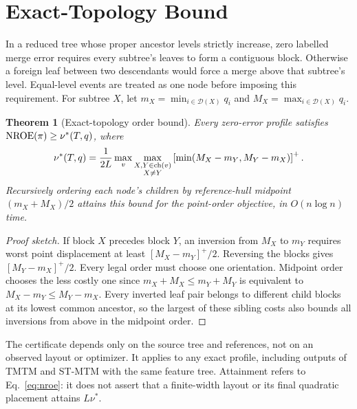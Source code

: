 \documentclass{vgtc}                %
\newtheorem{theorem}{Theorem}\newtheorem{lemma}{Lemma}\newtheorem{proposition}{Proposition}
\begin{document}
\section{Exact-Topology Bound}\label{sec:exact}
In a reduced tree whose proper ancestor levels strictly increase, zero labelled merge error requires every subtree's leaves to form a contiguous block. Otherwise a foreign leaf between two descendants would force a merge above that subtree's level. Equal-level events are treated as one node before imposing this requirement. For subtree $X$, let $m_X=\min_{i\in\mathcal{D}(X)}q_i$ and $M_X=\max_{i\in\mathcal{D}(X)}q_i$.

\begin{theorem}[Exact-topology order bound]\label{thm:order}
Every zero-error profile satisfies $\mathrm{NROE}(\pi)\ge\nu^*(T,q)$, where
\begin{equation}\label{eq:nu}
 \nu^*(T,q)=\frac{1}{2L}\max_v\max_{\substack{X,Y\in\mathrm{ch}(v)\\X\ne Y}}
 \left[\min(M_X-m_Y,M_Y-m_X)\right]^+.
\end{equation}
Recursively ordering each node's children by reference-hull midpoint $(m_X+M_X)/2$ attains this bound for the point-order objective, in $O(n\log n)$ time.
\end{theorem}
\begin{proof}[Proof sketch]
If block $X$ precedes block $Y$, an inversion from $M_X$ to $m_Y$ requires worst point displacement at least $[M_X-m_Y]^+/2$. Reversing the blocks gives $[M_Y-m_X]^+/2$. Every legal order must choose one orientation. Midpoint order chooses the less costly one since $m_X+M_X\le m_Y+M_Y$ is equivalent to $M_X-m_Y\le M_Y-m_X$. Every inverted leaf pair belongs to different child blocks at its lowest common ancestor, so the largest of these sibling costs also bounds all inversions from above in the midpoint order.
\end{proof}
The certificate depends only on the source tree and references, not on an observed layout or optimizer. It applies to any exact profile, including outputs of TMTM and ST-MTM with the same feature tree. Attainment refers to Eq.~\ref{eq:nroe}: it does not assert that a finite-width layout or its final quadratic placement attains $L\nu^*$.
\end{document}

